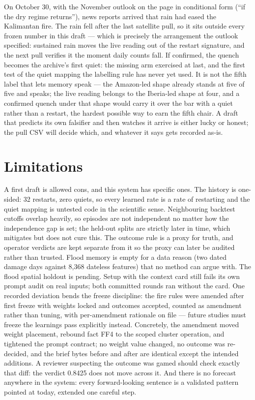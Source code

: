 \documentclass[11pt]{article}
\begin{document}
On October 30, with the November outlook on the page in conditional form
(``if the dry regime returns''), news reports arrived that rain had eased the
Kalimantan fire. The rain fell after the last satellite pull, so it sits
outside every frozen number in this draft --- which is precisely the
arrangement the outlook specified: sustained rain moves the live reading out
of the restart signature, and the next pull verifies it the moment daily
counts fall. If confirmed, the quench becomes the archive's first quiet:
the missing arm exercised at last, and the first test of the quiet mapping
the labelling rule has never yet used. It is not the fifth label that lets
memory speak --- the Amazon-led shape already stands at five of five and
speaks; the live reading belongs to the Iberia-led shape at four, and a
confirmed quench under that shape would carry it over the bar with a quiet
rather than a restart, the hardest possible way to earn the fifth chair. A
draft that predicts its own falsifier and then watches it arrive is either
lucky or honest; the pull CSV will decide which, and whatever it says gets
recorded as-is.

\section{Limitations}
\label{sec:limits}

A first draft is allowed cons, and this system has specific ones. The history
is one-sided: 32 restarts, zero quiets, so every learned rate is a rate of
restarting and the quiet mapping is untested code in the scientific sense.
Neighbouring backtest cutoffs overlap heavily, so episodes are not
independent no matter how the independence gap is set; the held-out splits
are strictly later in time, which mitigates but does not cure this. The
outcome rule is a proxy for truth, and operator verdicts are kept separate
from it so the proxy can later be audited rather than trusted. Flood memory
is empty for a data reason (two dated damage days against 8,368 dateless
features) that no method can argue with. The flood spatial holdout is
pending. Setup with the context card still fails its own prompt audit on real
inputs; both committed rounds ran without the card. One recorded deviation
bends the freeze discipline: the fire rules were amended after first freeze
with weights locked and outcomes accepted, counted as amendment rather than
tuning, with per-amendment rationale on file --- future studies must freeze
the learnings pass explicitly instead. Concretely, the amendment moved weight
placement, rebound fact FF4 to the scoped cluster operation, and tightened the
prompt contract; no weight value changed, no outcome was re-decided, and the
brief bytes before and after are identical except the intended additions. A
reviewer suspecting the outcome was gamed should check exactly that diff: the
verdict 0.8425 does not move across it. And there is no forecast anywhere in
the system: every forward-looking sentence is a validated pattern pointed at
today, extended one careful step.
\end{document}
